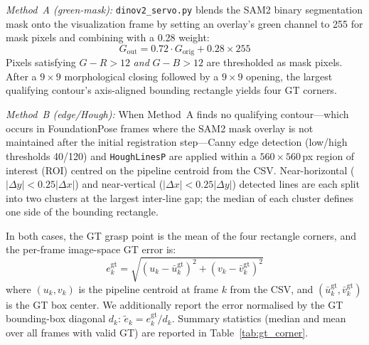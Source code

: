 \documentclass[letterpaper, 10 pt, conference]{ieeeconf}  %
\begin{document}
\emph{Method~A (green-mask):} \texttt{dinov2\_servo.py} blends the SAM2 binary segmentation mask onto the visualization frame by setting an overlay's green channel to 255 for mask pixels and combining with a 0.28 weight:
\begin{equation}
G_\text{out} = 0.72 \cdot G_\text{orig} + 0.28 \times 255
\label{eq:green_overlay}
\end{equation}
Pixels satisfying $G - R > 12$ \emph{and} $G - B > 12$ are thresholded as mask pixels. After a $9 \times 9$ morphological closing followed by a $9 \times 9$ opening, the largest qualifying contour's axis-aligned bounding rectangle yields four GT corners.

\emph{Method~B (edge/Hough):} When Method~A finds no qualifying contour—which occurs in FoundationPose frames where the SAM2 mask overlay is not maintained after the initial registration step—Canny edge detection (low/high thresholds 40/120) and \texttt{HoughLinesP} are applied within a $560 \times 560$\,px region of interest (ROI) centred on the pipeline centroid from the CSV. Near-horizontal ($|\Delta y| < 0.25|\Delta x|$) and near-vertical ($|\Delta x| < 0.25|\Delta y|$) detected lines are each split into two clusters at the largest inter-line gap; the median of each cluster defines one side of the bounding rectangle.

In both cases, the GT grasp point is the mean of the four rectangle corners, and the per-frame image-space GT error is:
\begin{equation}
e_k^{\mathrm{gt}} = \sqrt{(u_k - \bar{u}_k^{\mathrm{gt}})^2 + (v_k - \bar{v}_k^{\mathrm{gt}})^2}
\label{eq:gt_err}
\end{equation}
where $(u_k, v_k)$ is the pipeline centroid at frame $k$ from the CSV, and $(\bar{u}_k^{\mathrm{gt}}, \bar{v}_k^{\mathrm{gt}})$ is the GT box center. We additionally report the error normalised by the GT bounding-box diagonal $d_k$: $\tilde{e}_k = e_k^{\mathrm{gt}} / d_k$. Summary statistics (median and mean over all frames with valid GT) are reported in Table~\ref{tab:gt_corner}.
\end{document}
